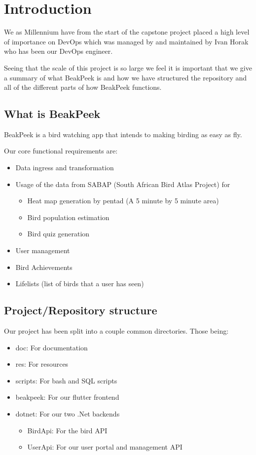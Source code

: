 \documentclass[a4paper]{article}
\begin{document}
\newpage

\section{Introduction}

We as Millennium have from the start of the capstone project placed a high 
level of importance on DevOps which was managed by and maintained by Ivan Horak
who has been our DevOps engineer.\newline

Seeing that the scale of this project is so large we feel it is important that we 
give a summary of what BeakPeek is and how we have structured the repository and 
all of the different parts of how BeakPeek functions.

\subsection{What is BeakPeek}
BeakPeek is a bird watching app that intends to making birding as easy as fly.\newline

Our core functional requirements are:
\begin{itemize}
    \item Data ingress and transformation
    \item Usage of the data from SABAP (South African Bird Atlas Project) for
        \begin{itemize}
            \item Heat map generation by pentad (A 5 minute by 5 minute area)
            \item Bird population estimation
            \item Bird quiz generation
        \end{itemize}
    \item User management
    \item Bird Achievements
    \item Lifelists (list of birds that a user has seen)
\end{itemize}

\subsection{Project/Repository structure}

Our project has been split into a couple common directories. 
Those being:
\begin{itemize}
    \item doc: For documentation
    \item res: For resources
    \item scripts: For bash and SQL scripts
    \item beakpeek: For our flutter frontend
    \item dotnet: For our two .Net backends
        \begin{itemize}
            \item BirdApi: For the bird API 
            \item UserApi: For our user portal and management API 
        \end{itemize}
\end{itemize}
\end{document}
